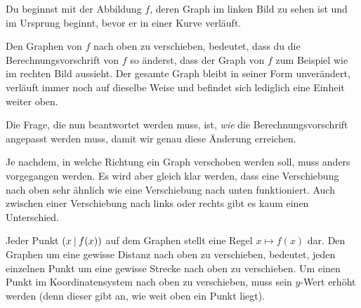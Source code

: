 \documentclass[../../main.tex]{subfiles}
\begin{document}
\begin{example}
    \begin{minipage}{\textwidth}
        Du beginnst mit der Abbildung $f$, deren Graph im linken Bild zu sehen ist und im Ursprung beginnt, bevor er in einer Kurve verläuft.
        
        Den Graphen von $f$ nach oben zu verschieben, bedeutet, dass du die Berechnungsvorschrift von $f$ so änderst, dass der Graph von $f$ zum Beispiel wie im rechten Bild aussieht. Der gesamte Graph bleibt in seiner Form unverändert, verläuft immer noch auf dieselbe Weise und befindet sich lediglich eine Einheit weiter oben.
        \begin{multicols}{2}\centering
            
        \end{multicols}
        
        Die Frage, die nun beantwortet werden muss, ist, \emph{wie} die Berechnungsvorschrift angepasst werden muss, damit wir genau diese Änderung erreichen.
    \end{minipage}
\end{example}

Je nachdem, in welche Richtung ein Graph verschoben werden soll, muss anders vorgegangen werden. Es wird aber gleich klar werden, dass eine Verschiebung nach oben sehr ähnlich wie eine Verschiebung nach unten funktioniert. Auch zwischen einer Verschiebung nach links oder rechts gibt es kaum einen Unterschied.

Jeder Punkt $\left(x \:\middle|\: f(x)\right)$ auf dem Graphen stellt eine Regel $x\mapsto f(x)$ dar. Den Graphen um eine gewisse Distanz nach oben zu verschieben, bedeutet, jeden einzelnen Punkt um eine gewisse Strecke nach oben zu verschieben. Um einen Punkt im Koordinatensystem nach oben zu verschieben, muss sein $y$-Wert erhöht werden (denn dieser gibt an, wie weit oben ein Punkt liegt).
\end{document}
